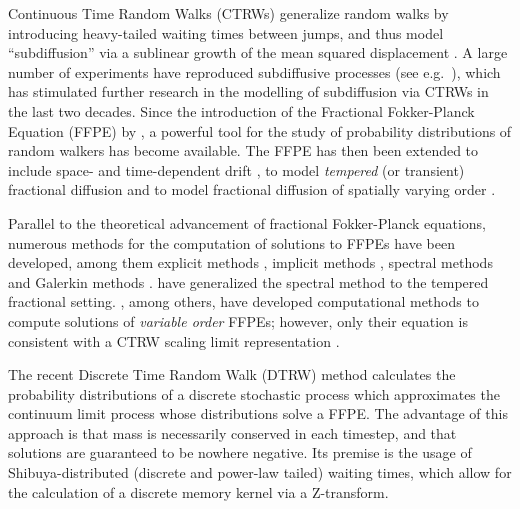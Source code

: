 \documentclass[a4paper,12pt]{elsarticle}
\numberwithin{equation}{section}
\theoremstyle{plain}
\theoremstyle{definition}
\theoremstyle{remark}
\numberwithin{equation}{section}
\newcommand{\1}{\mathbf 1}
\begin{document}
Continuous Time Random Walks (CTRWs) \citep{Scher1975} generalize random walks by introducing heavy-tailed waiting times between jumps, and thus model ``subdiffusion'' via a sublinear growth of the mean squared displacement \citep{HLS2010b}.   
A large number of experiments have reproduced subdiffusive processes (see e.g.\ \cite{Metzler2000,TMT04,Wong04,Banks2005,Santamaria2006a,
Berkowitz2008,Hofling2012,Regner2013}), which has stimulated further research in the modelling of subdiffusion via CTRWs in the last two decades. Since the introduction of the Fractional Fokker-Planck Equation (FFPE) by \cite{BMK00}, a powerful tool for the study of probability distributions of random walkers has become available.  
The FFPE has then been extended to include space- and time-dependent drift \citep{HLS10PRL},
to model \emph{tempered} (or transient) fractional diffusion \citep{Gajda2010,StrakaThesis,Zhang2015,Sabzikar2015}
and to model fractional diffusion of spatially varying order 
\citep{Chechkin2005a, Straka17}. 


Parallel to the theoretical advancement of fractional Fokker-Planck equations, numerous methods for the computation of solutions to FFPEs have been developed, among them explicit methods \citep{Yuste2005}, implicit methods \citep{Langlands2005a}, spectral methods \citep{Li2009} and Galerkin methods \citep{Mustapha2011}.  
\cite{Hanert2014} have generalized the spectral method to the tempered fractional setting.  \cite{Chen2010}, among others, have developed computational methods to compute solutions of \emph{variable order} FFPEs; however, only their equation is consistent with a CTRW scaling limit representation \citep{Straka17}. 

The recent Discrete Time Random Walk (DTRW) method \citep{Angstmann2015a,Angstmann2016a} calculates the probability distributions of a discrete stochastic process which approximates the continuum limit process whose distributions solve a FFPE. The advantage of this approach is that mass is necessarily conserved in each timestep, and that solutions are guaranteed to be nowhere negative.  Its premise is the usage of Shibuya-distributed (discrete and power-law tailed) waiting times, which allow for the calculation of a discrete memory kernel via a Z-transform. 
\end{document}
